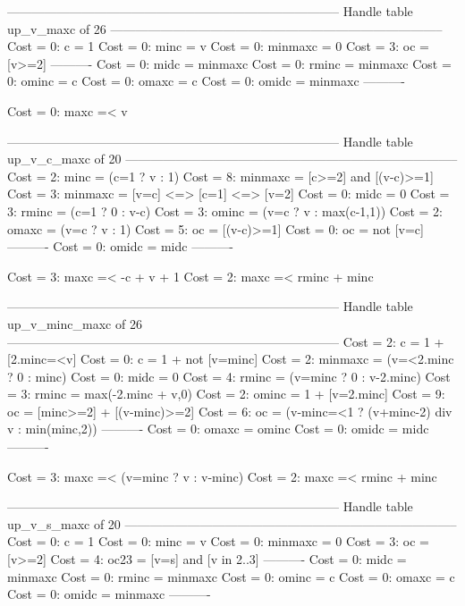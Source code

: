 --------------------------------------------------------------------------------
Handle table up_v_maxc of 26
--------------------------------------------------------------------------------
Cost =  0:  c       = 1
Cost =  0:  minc    = v
Cost =  0:  minmaxc = 0
Cost =  3:  oc      = [v>=2]
----------
Cost =  0:  midc    = minmaxc
Cost =  0:  rminc   = minmaxc
Cost =  0:  ominc   = c
Cost =  0:  omaxc   = c
Cost =  0:  omidc   = minmaxc
----------

Cost =  0:  maxc =< v

--------------------------------------------------------------------------------
Handle table up_v_c_maxc of 20
--------------------------------------------------------------------------------
Cost =  2:  minc    = (c=1 ? v : 1)
Cost =  8:  minmaxc = [c>=2] and [(v-c)>=1]
Cost =  3:  minmaxc = [v=c] <=> [c=1] <=> [v=2]
Cost =  0:  midc    = 0
Cost =  3:  rminc   = (c=1 ? 0 : v-c)
Cost =  3:  ominc   = (v=c ? v : max(c-1,1))
Cost =  2:  omaxc   = (v=c ? v : 1)
Cost =  5:  oc      = [(v-c)>=1]
Cost =  0:  oc      = not [v=c]
----------
Cost =  0:  omidc   = midc
----------

Cost =  3:  maxc =< -c + v + 1
Cost =  2:  maxc =< rminc + minc

--------------------------------------------------------------------------------
Handle table up_v_minc_maxc of 26
--------------------------------------------------------------------------------
Cost =  2:  c       = 1 + [2.minc=<v]
Cost =  0:  c       = 1 + not [v=minc]
Cost =  2:  minmaxc = (v=<2.minc ? 0 : minc)
Cost =  0:  midc    = 0
Cost =  4:  rminc   = (v=minc ? 0 : v-2.minc)
Cost =  3:  rminc   = max(-2.minc + v,0)
Cost =  2:  ominc   = 1 + [v=2.minc]
Cost =  9:  oc      = [minc>=2] + [(v-minc)>=2]
Cost =  6:  oc      = (v-minc=<1 ? (v+minc-2) div v : min(minc,2))
----------
Cost =  0:  omaxc   = ominc
Cost =  0:  omidc   = midc
----------

Cost =  3:  maxc =< (v=minc ? v : v-minc)
Cost =  2:  maxc =< rminc + minc

--------------------------------------------------------------------------------
Handle table up_v_s_maxc of 20
--------------------------------------------------------------------------------
Cost =  0:  c       = 1
Cost =  0:  minc    = v
Cost =  0:  minmaxc = 0
Cost =  3:  oc      = [v>=2]
Cost =  4:  oc23    = [v=s] and [v in 2..3]
----------
Cost =  0:  midc    = minmaxc
Cost =  0:  rminc   = minmaxc
Cost =  0:  ominc   = c
Cost =  0:  omaxc   = c
Cost =  0:  omidc   = minmaxc
----------

